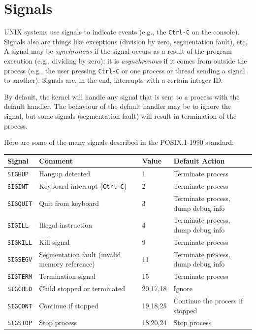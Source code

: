 \section*{Signals}

UNIX systems use signals to indicate events (e.g., the \texttt{Ctrl-C} on the console). Signals also are things like exceptions (division by zero, segmentation fault), etc. A signal may be \textit{synchronous} if the signal occurs as a result of the program execution (e.g., dividing by zero); it is \textit{asynchronous} if it comes from outside the process (e.g., the user pressing \texttt{Ctrl-C} or one process or thread sending a signal to another). Signals are, in the end, interrupts with a certain integer ID.

By default, the kernel will handle any signal that is sent to a process with the default handler. The behaviour of the default handler may be to ignore the signal, but some signals (segmentation fault) will result in termination of the process.


Here are some of the many signals described in the POSIX.1-1990 standard:

\begin{center}
	\begin{tabular}{l|l|l|l}
		\textbf{Signal}  & \textbf{Comment}                              & \textbf{Value} & \textbf{Default Action}            \\ \hline
		\texttt{SIGHUP}  & Hangup detected                               & 1              & Terminate process                  \\
		\texttt{SIGINT}  & Keyboard interrupt (\texttt{Ctrl-C})          & 2              & Terminate process                  \\
		\texttt{SIGQUIT} & Quit from keyboard                            & 3              & Terminate process, dump debug info \\
		\texttt{SIGILL}  & Illegal instruction                           & 4              & Terminate process, dump debug info \\
		\texttt{SIGKILL} & Kill signal                                   & 9              & Terminate process                  \\
		\texttt{SIGSEGV} & Segmentation fault (invalid memory reference) & 11             & Terminate process, dump debug info \\
		\texttt{SIGTERM} & Termination signal                            & 15             & Terminate process                  \\
		\texttt{SIGCHLD} & Child stopped or terminated                   & 20,17,18       & Ignore                             \\
		\texttt{SIGCONT} & Continue if stopped                           & 19,18,25       & Continue the process if stopped    \\
		\texttt{SIGSTOP} & Stop process                                  & 18,20,24       & Stop process                       \\
	\end{tabular}
\end{center}


